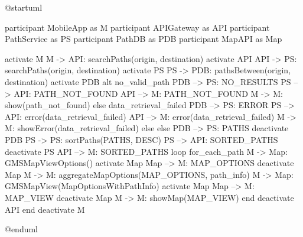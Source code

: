 @startuml

participant MobileApp as M
participant APIGateway as API
participant PathService as PS
participant PathDB as PDB
participant MapAPI as Map

activate M
M -> API: searchPaths(origin, destination)
activate API
API -> PS: searchPaths(origin, destination)
activate PS
PS -> PDB: pathsBetween(origin, destination)
activate PDB
alt no_valid_path
PDB --> PS: NO_RESULTS
PS --> API: PATH_NOT_FOUND
API --> M: PATH_NOT_FOUND
M -> M: show(path_not_found)
else data_retrieval_failed
PDB --> PS: ERROR
PS --> API: error(data_retrieval_failed)
API --> M: error(data_retrieval_failed)
M -> M: showError(data_retrieval_failed)
else else
PDB --> PS: PATHS
deactivate PDB
PS -> PS: sortPaths(PATHS, DESC)
PS --> API: SORTED_PATHS
deactivate PS
API --> M: SORTED_PATHS
loop for_each_path
M -> Map: GMSMapViewOptions()
activate Map
Map --> M: MAP_OPTIONS
deactivate Map
M -> M: aggregateMapOptions(MAP_OPTIONS, path_info)
M -> Map: GMSMapView(MapOptionsWithPathInfo)
activate Map
Map --> M: MAP_VIEW
deactivate Map
M -> M: showMap(MAP_VIEW)
end
deactivate API
end
deactivate M


@enduml